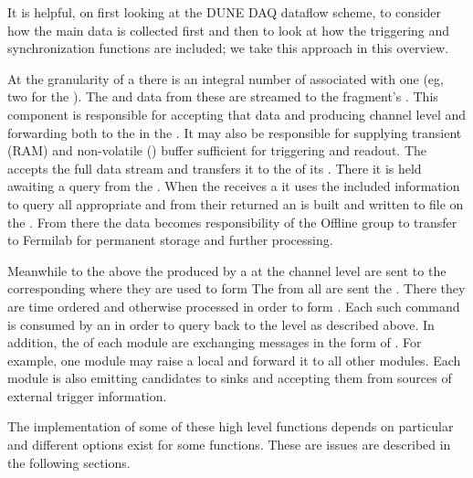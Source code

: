 It is helpful, on first looking at the DUNE DAQ dataflow scheme, to
consider how the main data is collected first and then to look at how
the triggering and synchronization functions are included; we take
this approach in this overview. 

At the granularity of a  there is an integral number of
 associated with one  (eg, two 
for the  ).
The  and  data from these  are
streamed to the fragment's . 
This component is responsible for accepting that data and producing
channel level  and forwarding both to the
 in the . 
It may also be responsible for supplying transient (RAM) and
non-volatile () buffer sufficient for 
triggering and readout.
The  accepts the full data stream and transfers it to the
 of its . 
There it is held awaiting a query from the . 
When the  receives a  it uses the
included information to query all appropriate  and from
their returned  an  is built and
written to file on the . 
From there the data becomes responsibility of the Offline group to
transfer to Fermilab for permanent storage and further processing.

Meanwhile to the above the  produced by a
 at the channel level are sent to the corresponding
 where they are used to form  The
 from all  are sent the
. 
There they are time ordered and otherwise processed in order to form
. 
Each such command is consumed by an  in order to query back
to the  level as described above.
In addition, the  of each module are exchanging messages
in the form of . 
For example, one module may raise a local 
 and forward it to all other modules.
Each module is also emitting candidates to sinks and accepting them
from sources of external trigger information.

The implementation of some of these high level functions depends on
particular  and different options exist for some
functions.  These are issues are described in the following sections.

